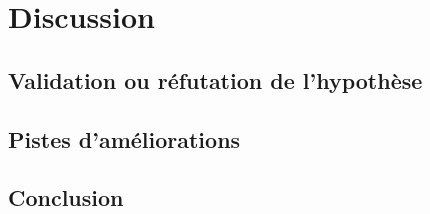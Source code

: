 \chapter{Discussion}
\section{Validation ou réfutation de l'hypothèse}
\section{Pistes d'améliorations}
\section{Conclusion}
